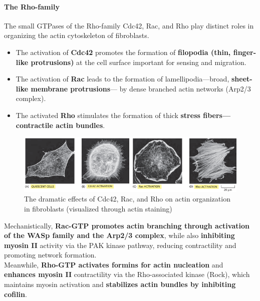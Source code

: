 \documentclass[../main.tex]{subfiles}
\begin{document}
\paragraph{The Rho-family}
The small GTPases of the Rho-family Cdc42, Rac, and Rho play distinct roles in organizing the actin cytoskeleton of fibroblasts. 
\begin{itemize}
	\item The activation of \textbf{\gls{Cdc42}} promotes the formation of \textbf{filopodia (thin, finger-like protrusions)} at the cell surface important for sensing and migration.
	
	\item The activation of \textbf{\gls{Rac}} leads to the formation of lamellipodia—broad, \textbf{sheet-like membrane protrusions}— by dense branched actin networks (Arp2/3 complex).
	
	\item The activated \textbf{\gls{Rho}} stimulates the formation of thick \textbf{stress fibers—contractile actin bundles}.
\end{itemize}
\begin{figure}[H]
	\centering
	\includegraphics[width = \textwidth]{44}
	\caption{The dramatic effects of Cdc42, Rac, and Rho on actin organization in fibroblasts (visualized through actin staining)}
\end{figure}

Mechanistically, \textbf{Rac-GTP promotes actin branching through activation of the WASp family and the Arp2/3 complex}, while also \textbf{inhibiting myosin II} activity via the PAK kinase pathway, reducing contractility and promoting network formation. \\
\indent Meanwhile, \textbf{Rho-GTP activates formins for actin nucleation} and \textbf{enhances myosin II} contractility via the Rho-associated kinase (Rock), which maintains myosin activation and \textbf{stabilizes actin bundles by inhibiting cofilin}.
\end{document}
